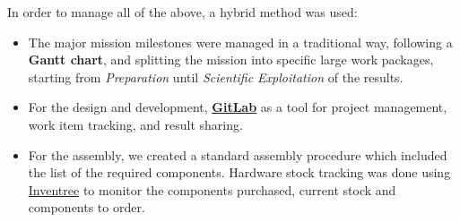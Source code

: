 \documentclass[]{iac}
\begin{document}
In order to manage all of the above, a hybrid method was used:
\begin{itemize}
\item The major mission milestones were managed in a traditional way, following a \textbf{Gantt chart}, and splitting the mission into specific large work packages, starting from \emph{Preparation} until \emph{Scientific Exploitation} of the results.

\item For the design and development, \href{https://gitlab.com/}{\textbf{GitLab}} as a tool for project management, work item tracking, and result sharing.
\item For the assembly, we created a standard assembly procedure which included the list of the required components. Hardware stock tracking was done using \href{https://inventree.readthedocs.io/en/latest/}{Inventree} to monitor the components purchased, current stock and components to order. %
\end{itemize}
\end{document}
